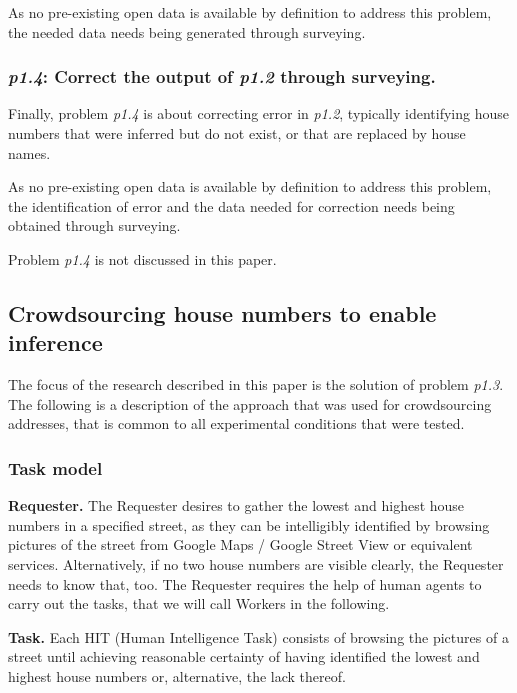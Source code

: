         As no pre-existing open data is available by definition to address this problem, the needed data needs being generated through surveying. 

    \subsubsection{{\it p1.4}: Correct the output of {\it p1.2} through surveying.} 

        Finally, problem {\it p1.4} is about correcting error in {\it p1.2}, typically identifying house numbers that were inferred but do not exist, or that are replaced by house names.
        
        As no pre-existing open data is available by definition to address this problem, the identification of error and the data needed for correction needs being obtained through surveying. 

        Problem {\it p1.4} is not discussed in this paper.

\subsection{Crowdsourcing house numbers to enable inference}

    The focus of the research described in this paper is the solution of problem {\it p1.3}. The following is a description of the approach that was used for crowdsourcing addresses, that is common to all experimental conditions that were tested.

    \subsubsection{Task model}

        \textbf{Requester.} The Requester desires to gather the lowest and highest house numbers in a specified street, as they can be intelligibly identified by browsing pictures of the street from Google Maps / Google Street View or equivalent services. Alternatively, if no two house numbers are visible clearly, the Requester needs to know that, too. The Requester requires the help of human agents to carry out the tasks, that we will call Workers in the following.
        
        \textbf{Task.} Each HIT (Human Intelligence Task) consists of browsing the pictures of a street until achieving reasonable certainty of having identified the lowest and highest house numbers or, alternative, the lack thereof.
        
